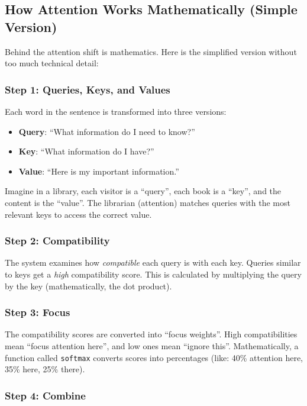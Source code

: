 \documentclass[11pt,a4paper]{article}
\begin{document}
\subsection{How Attention Works Mathematically (Simple Version)}

Behind the attention shift is mathematics. Here is the simplified version without too much technical detail:

\subsubsection{Step 1: Queries, Keys, and Values}

Each word in the sentence is transformed into three versions:
\begin{itemize}[leftmargin=*]
    \item \textbf{Query}: ``What information do I need to know?''
    \item \textbf{Key}: ``What information do I have?''
    \item \textbf{Value}: ``Here is my important information.''
\end{itemize}

Imagine in a library, each visitor is a ``query'', each book is a ``key'', and the content is the ``value''. The librarian (attention) matches queries with the most relevant keys to access the correct value.

\subsubsection{Step 2: Compatibility}

The system examines how \emph{compatible} each query is with each key. Queries similar to keys get a \emph{high} compatibility score. This is calculated by multiplying the query by the key (mathematically, the dot product).

\subsubsection{Step 3: Focus}

The compatibility scores are converted into ``focus weights''. High compatibilities mean ``focus attention here'', and low ones mean ``ignore this''. Mathematically, a function called \texttt{softmax} converts scores into percentages (like: 40\% attention here, 35\% here, 25\% there).

\subsubsection{Step 4: Combine}
\end{document}
